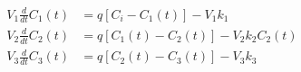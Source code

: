 \begin{equation}
  \begin{aligned}
    V_1 \frac{d}{dt}C_1(t) & = q [C_i - C_1(t)] - V_1 k_1
    \\
    V_2 \frac{d}{dt}C_2(t) & = q [C_1(t) - C_2(t)] - V_2 k_2 C_2(t)
    \\
    V_3 \frac{d}{dt}C_3(t) & = q [C_2(t) - C_3(t)] - V_3 k_3
  \end{aligned}
  \label{eq:three_stirred_tank02_1}
\end{equation}